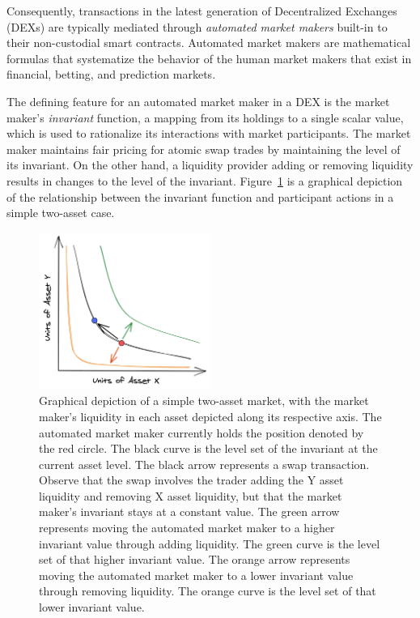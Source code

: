 \documentclass[11pt]{article}
\begin{document}
Consequently, transactions in the latest generation of Decentralized Exchanges (DEXs) are typically mediated through \emph{automated market makers} built-in to their non-custodial smart contracts. Automated market makers are mathematical formulas that systematize the behavior of the human market makers that exist in financial, betting, and prediction markets. 

The defining feature for an automated market maker in a DEX is the market maker's \emph{invariant} function, a mapping from its holdings to a single scalar value, which is used to rationalize its interactions with market participants. The market maker maintains fair pricing for atomic swap trades by maintaining the level of its invariant. On the other hand, a liquidity provider adding or removing liquidity results in changes to the level of the invariant. Figure~\ref{fig:twoasset} is a graphical depiction of the relationship between the invariant function and participant actions in a simple two-asset case.

\begin{figure}[htbp]
\begin{center}
\includegraphics[width=0.5\textwidth]{TwoAssets}
\caption{Graphical depiction of a simple two-asset market, with the market maker's liquidity in each asset depicted along its respective axis. The automated market maker currently holds the position denoted by the red circle. The black curve is the level set of the invariant at the current asset level. The black arrow represents a swap transaction. Observe that the swap involves the trader adding the Y asset liquidity and removing X asset liquidity, but that the market maker's invariant stays at a constant value.
The green arrow represents moving the automated market maker to a higher invariant value through adding liquidity. The green curve is the level set of that higher invariant value. The orange arrow represents moving the automated market maker to a lower invariant value through removing liquidity. The orange curve is the level set of that lower invariant value.
}
\label{fig:twoasset}
\end{center}
\end{figure}
\end{document}
